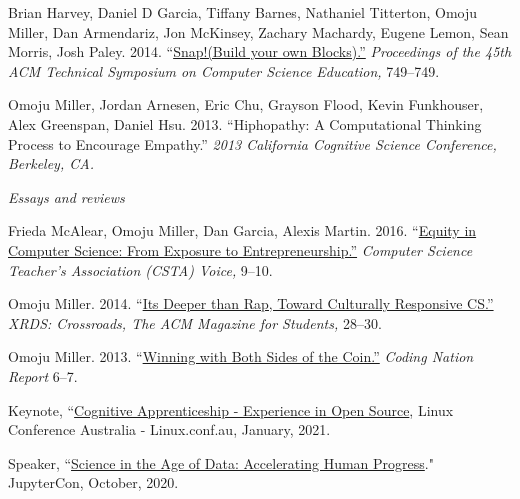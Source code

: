 \documentclass[11pt,article,oneside]{memoir}
\begin{document}
\ind Brian Harvey, Daniel D Garcia, Tiffany Barnes, Nathaniel Titterton, Omoju Miller, Dan Armendariz, Jon McKinsey, Zachary Machardy, Eugene Lemon, Sean Morris, Josh Paley. 2014. ``\href{http://dl.acm.org/citation.cfm?id=2539022}{Snap!(Build your own Blocks).''} \emph{Proceedings of the 45th ACM Technical Symposium on Computer Science Education,} 749--749.

\ind Omoju Miller, Jordan Arnesen, Eric Chu, Grayson Flood, Kevin Funkhouser, Alex Greenspan, Daniel Hsu. 2013. ``Hiphopathy: A Computational Thinking Process to Encourage Empathy.'' \emph{2013 California Cognitive Science Conference, Berkeley, CA.}

\bigskip
\noindent\emph{Essays and reviews \vspace{0.05in}}



\ind Frieda McAlear, Omoju Miller, Dan Garcia, Alexis Martin. 2016. ``\href{http://www.csta.acm.org/Communications/sub/CSTAVoice_Files/csta_voice_01_2016.pdf}{Equity in Computer Science: From Exposure to Entrepreneurship.''} \emph{Computer Science Teacher's Association (CSTA) Voice, } 9--10.

\ind Omoju Miller. 2014. ``\href{http://dl.acm.org/citation.cfm?id=2604994}{Its Deeper than Rap, Toward Culturally Responsive CS.'' }\emph{XRDS: Crossroads,  The ACM Magazine for Students, } 28--30.

\ind Omoju Miller. 2013. ``\href{http://kaporcenter.org/wp-content/uploads/2013/10/Kapor_CodingLandscape_R3.pdf}{Winning with Both Sides of the Coin.''} \emph{Coding Nation Report} 6--7.

 \bigskip


\medskip

\ind Keynote, ``\href{https://www.youtube.com/watch?v=JShvXcL66NQ}{Cognitive Apprenticeship - Experience in Open Source}, Linux Conference Australia - Linux.conf.au, January, 2021.

\ind Speaker, ``\href{https://www.youtube.com/watch?v=JHS9yQMUzb0}{Science in the Age of Data: Accelerating Human Progress}." JupyterCon, October, 2020.
\end{document}
